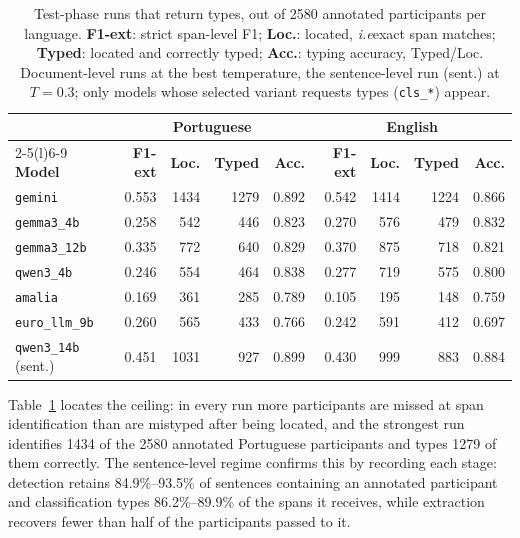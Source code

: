 \documentclass[extendedabs]{recpad2k}
\newcommand{\ubk}{\_\allowbreak}
\def\ie{\emph{i.e}\bmvaOneDot}
\begin{document}
\begin{table}[H]
\centering
\captionsetup{position=bottom}
{\scriptsize
\setlength{\tabcolsep}{2pt}
\begin{tabular}{@{}l rrrr rrrr@{}}
\toprule
& \multicolumn{4}{c}{\textbf{Portuguese}} & \multicolumn{4}{c}{\textbf{English}} \\
\cmidrule(lr){2-5}\cmidrule(l){6-9}
\textbf{Model} & \textbf{F1-ext} & \textbf{Loc.} & \textbf{Typed} & \textbf{Acc.} & \textbf{F1-ext} & \textbf{Loc.} & \textbf{Typed} & \textbf{Acc.} \\
\midrule
\texttt{gemini}                & 0.553 & 1434 & 1279 & 0.892 & 0.542 & 1414 & 1224 & 0.866 \\
\texttt{gemma3\ubk{}4b}        & 0.258 & 542  & 446  & 0.823 & 0.270 & 576  & 479  & 0.832 \\
\texttt{gemma3\ubk{}12b}       & 0.335 & 772  & 640  & 0.829 & 0.370 & 875  & 718  & 0.821 \\
\texttt{qwen3\ubk{}4b}         & 0.246 & 554  & 464  & 0.838 & 0.277 & 719  & 575  & 0.800 \\
\texttt{amalia}                & 0.169 & 361  & 285  & 0.789 & 0.105 & 195  & 148  & 0.759 \\
\texttt{euro\ubk{}llm\ubk{}9b} & 0.260 & 565  & 433  & 0.766 & 0.242 & 591  & 412  & 0.697 \\
\texttt{qwen3\ubk{}14b} (sent.) & 0.451 & 1031 & 927 & 0.899 & 0.430 & 999  & 883  & 0.884 \\
\bottomrule
\end{tabular}}
\caption{Test-phase runs that return types, out of 2580 annotated participants per language. \textbf{F1-ext}: strict span-level F1; \textbf{Loc.}: located, \ie exact span matches; \textbf{Typed}: located and correctly typed; \textbf{Acc.}: typing accuracy, Typed/Loc. Document-level runs at the best temperature, the sentence-level run (sent.) at $T=0.3$; only models whose selected variant requests types (\texttt{cls\_*}) appear.}
\label{tab:funnel}
\end{table}

Table~\ref{tab:funnel} locates the ceiling: in every run more participants are missed at span identification than are mistyped after being located, and the strongest run identifies 1434 of the 2580 annotated Portuguese participants and types 1279 of them correctly. The sentence-level regime confirms this by recording each stage: detection retains 84.9\%--93.5\% of sentences containing an annotated participant and classification types 86.2\%--89.9\% of the spans it receives, while extraction recovers fewer than half of the participants passed to it.
\end{document}
